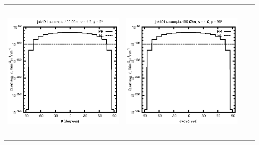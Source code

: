 \begin{tabular}{c c c c}
\includegraphics[height=7cm]{../eps/jok10_Lu_sample_100.00m_fwd.eps} &
\includegraphics[height=7cm]{../eps/jok10_Lu_sample_100.00m_cross.eps} \\
\end{tabular}

\pagebreak

